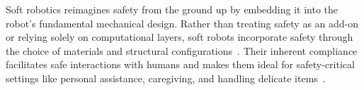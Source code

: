 Soft robotics reimagines safety from the ground up by embedding it into the robot’s fundamental mechanical design. Rather than treating safety as an add-on or relying solely on computational layers, soft robots incorporate safety through the choice of materials and structural configurations~\cite{rus2015design, laschi2016soft}. Their inherent compliance facilitates safe interactions with humans and makes them ideal for safety-critical settings like personal assistance, caregiving, and handling delicate items~\cite{abidi2017intrinsic, yumbla2021human}.
